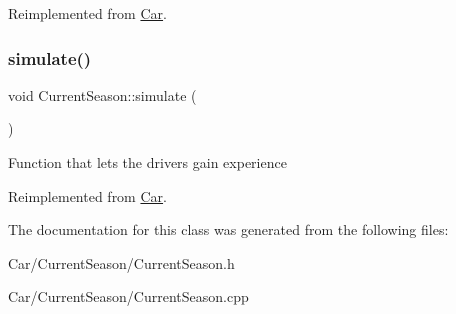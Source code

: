 Reimplemented from \hyperlink{classCar_a72a79de673e860c1f177791bee87c529}{Car}.

\mbox{\label{classCurrentSeason_a4828aaa2c0b914b55ebb34c0d1062e8e}} 
\subsubsection{\texorpdfstring{simulate()}{simulate()}}
{\footnotesize\ttfamily void Current\+Season\+::simulate (\begin{DoxyParamCaption}{ }\end{DoxyParamCaption})\hspace{0.3cm}{\ttfamily [virtual]}}

Function that lets the drivers gain experience 

Reimplemented from \hyperlink{classCar_af2532d9bbcda730f936f9633d8ee8d71}{Car}.



The documentation for this class was generated from the following files\+:\begin{DoxyCompactItemize}
\item 
Car/\+Current\+Season/Current\+Season.\+h\item 
Car/\+Current\+Season/Current\+Season.\+cpp\end{DoxyCompactItemize}
